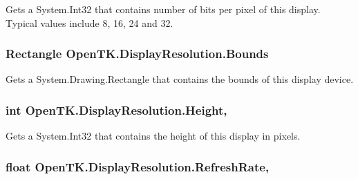 Gets a System.\-Int32 that contains number of bits per pixel of this display. Typical values include 8, 16, 24 and 32.

\hypertarget{class_open_t_k_1_1_display_resolution_aa413eee2359d6426fbcec8280fce9c29}{
\subsubsection[{Bounds}]{\setlength{\rightskip}{0pt plus 5cm}Rectangle Open\-T\-K.\-Display\-Resolution.\-Bounds\hspace{0.3cm}{\ttfamily [get]}}}\label{class_open_t_k_1_1_display_resolution_aa413eee2359d6426fbcec8280fce9c29}


Gets a System.\-Drawing.\-Rectangle that contains the bounds of this display device. 

\hypertarget{class_open_t_k_1_1_display_resolution_a2a507b345a19dec923c9e14f6b003bd5}{
\subsubsection[{Height}]{\setlength{\rightskip}{0pt plus 5cm}int Open\-T\-K.\-Display\-Resolution.\-Height\hspace{0.3cm}{\ttfamily [get]}, {\ttfamily [set]}}}\label{class_open_t_k_1_1_display_resolution_a2a507b345a19dec923c9e14f6b003bd5}


Gets a System.\-Int32 that contains the height of this display in pixels.

\hypertarget{class_open_t_k_1_1_display_resolution_a5d661a58b45850d6f55dbda121598b89}{
\subsubsection[{Refresh\-Rate}]{\setlength{\rightskip}{0pt plus 5cm}float Open\-T\-K.\-Display\-Resolution.\-Refresh\-Rate\hspace{0.3cm}{\ttfamily [get]}, {\ttfamily [set]}}}\label{class_open_t_k_1_1_display_resolution_a5d661a58b45850d6f55dbda121598b89}


